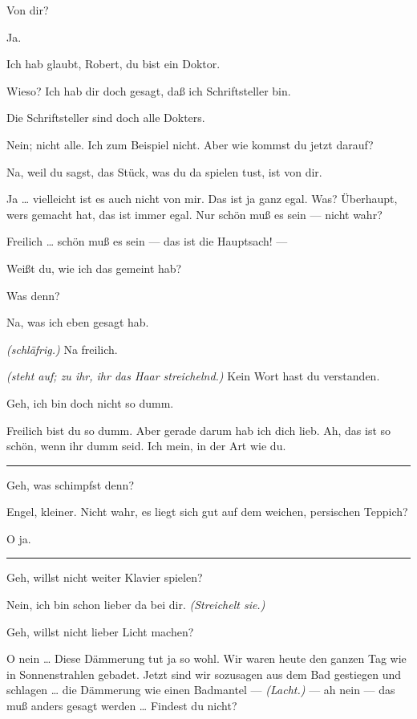 \documentclass[
	final,
	a4paper,
	ngerman,
	mpinclude = true, %
	twoside = true,
	open = right,
	cleardoublepage = plain,
	DIV = 13,
	BCOR = 1cm,
	titlepage = firstiscover,
	]{scrbook}
\newcommand{\direction}[1]{\textit{(#1)}}
\newenvironment{deletion}{%
		\vspace{0.25\baselineskip}
		\hrule
		\vspace{0.25\baselineskip}
		\color{darkgray}
	}{
		\color{black}
		\vspace{0.25\baselineskip}
		\hrule 
		\vspace{0.25\baselineskip}
	}
\newcommand{\thecharacter}[1]{\textup{\textsc{#1}}\xspace}
\newcommand{\thesuesse}{\thecharacter{Lola}}
\newcommand{\thedichter}{\thecharacter{Robert Bibitz}}
\newcommand{\character}[1]{\item[#1:]}
\newcommand{\suesse}{\character{\thesuesse}}
\newcommand{\dichter}{\character{\thedichter}}
\begin{document}
\begin{play}
	\suesse
	Von dir?

	\dichter
	Ja.

	\suesse
	Ich hab glaubt, Robert, du bist ein Doktor.

	\dichter
	Wieso? Ich hab dir doch gesagt, daß ich Schriftsteller bin.

	\suesse
	Die Schriftsteller sind doch alle Dokters.

	\dichter
	Nein; nicht alle. Ich zum Beispiel nicht. Aber wie kommst du jetzt darauf?

	\suesse
	Na, weil du sagst, das Stück, was du da spielen tust, ist von dir.

	\dichter
	Ja \ldots{} vielleicht ist es auch nicht von mir. Das ist ja ganz egal. Was? Überhaupt, wers gemacht hat, das ist immer egal. Nur schön muß es sein --- nicht wahr?

	\suesse
	Freilich \ldots{} schön muß es sein --- das ist die Hauptsach! ---

	\dichter
	Weißt du, wie ich das gemeint hab?

	\suesse
	Was denn?

	\dichter
	Na, was ich eben gesagt hab.

	\suesse
	\direction{schläfrig.} Na freilich.

	\dichter
	\direction{steht auf; zu ihr, ihr das Haar streichelnd.} Kein Wort hast du verstanden.

	\suesse
	Geh, ich bin doch nicht so dumm.

	\dichter
	Freilich bist du so dumm. Aber gerade darum hab ich dich lieb. Ah, das ist so schön, wenn ihr dumm seid. Ich mein, in der Art wie du.

	\begin{deletion}
	\suesse
	Geh, was schimpfst denn?

	\dichter
	Engel, kleiner. Nicht wahr, es liegt sich gut auf dem weichen, persischen Teppich?

	\suesse
	O ja.
	\end{deletion}
	\suesse
	Geh, willst nicht weiter Klavier spielen?

	\dichter
	Nein, ich bin schon lieber da bei dir. \direction{Streichelt sie.}

	\suesse
	Geh, willst nicht lieber Licht machen?

	\dichter
	O nein \ldots{} Diese Dämmerung tut ja so wohl. Wir waren heute den ganzen Tag wie in Sonnenstrahlen gebadet. Jetzt sind wir sozusagen aus dem Bad gestiegen und schlagen \ldots{} die Dämmerung wie einen Badmantel --- \direction{Lacht.} --- ah nein --- das muß anders gesagt werden \ldots{} Findest du nicht?


\end{play}
\end{document}
